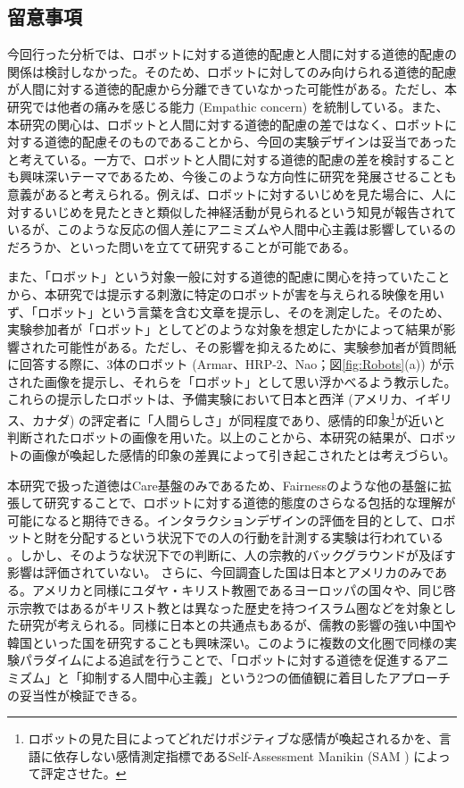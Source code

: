 \documentclass[a4j,12pt]{jreport}
\begin{document}
\subsection{留意事項}
今回行った分析では、ロボットに対する道徳的配慮と人間に対する道徳的配慮の関係は検討しなかった。そのため、ロボットに対してのみ向けられる道徳的配慮が人間に対する道徳的配慮から分離できていなかった可能性がある。ただし、本研究では他者の痛みを感じる能力 (Empathic concern) を統制している。また、本研究の関心は、ロボットと人間に対する道徳的配慮の差ではなく、ロボットに対する道徳的配慮そのものであることから、今回の実験デザインは妥当であったと考えている。一方で、ロボットと人間に対する道徳的配慮の差を検討することも興味深いテーマであるため、今後このような方向性に研究を発展させることも意義があると考えられる。例えば、ロボットに対するいじめを見た場合に、人に対するいじめを見たときと類似した神経活動が見られるという知見\cite{fmri}が報告されているが、このような反応の個人差にアニミズムや人間中心主義は影響しているのだろうか、といった問いを立てて研究することが可能である。



また、「ロボット」という対象一般に対する道徳的配慮に関心を持っていたことから、本研究では提示する刺激に特定のロボットが害を与えられる映像を用いず、「ロボット」という言葉を含む文章を提示し、そのを測定した。そのため、実験参加者が「ロボット」としてどのような対象を想定したかによって結果が影響された可能性がある。ただし、その影響を抑えるために、実験参加者が質問紙に回答する際に、3体のロボット (Armar、HRP-2、Nao；図\ref{fig:Robots}(a)) が示された画像を提示し、それらを「ロボット」として思い浮かべるよう教示した。これらの提示したロボットは、予備実験において日本と西洋 (アメリカ、イギリス、カナダ) の評定者に「人間らしさ」が同程度であり、感情的印象\footnote{ロボットの見た目によってどれだけポジティブな感情が喚起されるかを、言語に依存しない感情測定指標であるSelf-Assessment Manikin (SAM \cite{sam}) によって評定させた。}が近いと判断されたロボットの画像\cite{ikari}を用いた。以上のことから、本研究の結果が、ロボットの画像が喚起した感情的印象の差異によって引き起こされたとは考えづらい。


本研究で扱った道徳はCare基盤のみであるため、Fairnessのような他の基盤に拡張して研究することで、ロボットに対する道徳的態度のさらなる包括的な理解が可能になると期待できる。インタラクションデザインの評価を目的として、ロボットと財を分配するという状況下での人の行動を計測する実験は行われている\cite{fairness} 。しかし、そのような状況下での判断に、人の宗教的バックグラウンドが及ぼす影響は評価されていない。
さらに、今回調査した国は日本とアメリカのみである。アメリカと同様にユダヤ・キリスト教圏であるヨーロッパの国々や、同じ啓示宗教ではあるがキリスト教とは異なった歴史を持つイスラム圏などを対象とした研究が考えられる。同様に日本との共通点もあるが、儒教の影響の強い中国や韓国といった国を研究することも興味深い。このように複数の文化圏で同様の実験パラダイムによる追試を行うことで、「ロボットに対する道徳を促進するアニミズム」と「抑制する人間中心主義」という2つの価値観に着目したアプローチの妥当性が検証できる。
\end{document}
